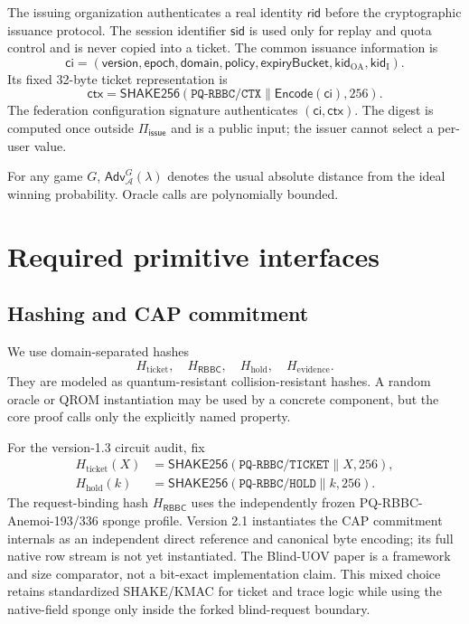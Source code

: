 \documentclass[11pt]{article}
\newcommand{\RBBC}{\mathsf{RBBC}}
\newcommand{\Piiss}{\Pi_{\mathsf{issue}}}
\newcommand{\Adv}{\mathsf{Adv}}
\newcommand{\rid}{\mathsf{rid}}
\newcommand{\ctx}{\mathsf{ctx}}
\begin{document}
The issuing organization authenticates a real identity $\rid$ before the
cryptographic issuance protocol.  The session identifier $\mathsf{sid}$ is used
only for replay and quota control and is never copied into a ticket.  The common
issuance information is
\[
  \mathsf{ci}=(\mathsf{version},\mathsf{epoch},\mathsf{domain},
  \mathsf{policy},\mathsf{expiryBucket},\mathsf{kid}_{\mathrm{OA}},
  \mathsf{kid}_{\mathrm{I}}).
\]
Its fixed 32-byte ticket representation is
\[
 \ctx=\mathsf{SHAKE256}(\mathtt{PQ\mbox{-}RBBC/CTX}\|
       \mathsf{Encode}(\mathsf{ci}),256).
\]
The federation configuration signature authenticates $(\mathsf{ci},\ctx)$.
The digest is computed once outside $\Piiss$ and is a public input; the issuer
cannot select a per-user value.

For any game $G$, $\Adv^G_{\mathcal A}(\lambda)$ denotes the usual absolute
distance from the ideal winning probability.  Oracle calls are polynomially
bounded.

\section{Required primitive interfaces}

\subsection{Hashing and CAP commitment}

We use domain-separated hashes
\[
  H_{\mathrm{ticket}},\quad H_{\RBBC},\quad H_{\mathrm{hold}},\quad
  H_{\mathrm{evidence}}.
\]
They are modeled as quantum-resistant collision-resistant hashes.  A random
oracle or QROM instantiation may be used by a concrete component, but the core
proof calls only the explicitly named property.

For the version-1.3 circuit audit, fix
\begin{align*}
 H_{\mathrm{ticket}}(X)&=\mathsf{SHAKE256}
   (\mathtt{PQ\mbox{-}RBBC/TICKET}\|X,256),\\
 H_{\mathrm{hold}}(k)&=\mathsf{SHAKE256}
   (\mathtt{PQ\mbox{-}RBBC/HOLD}\|k,256).
\end{align*}
The request-binding hash $H_{\RBBC}$ uses the independently frozen
PQ-RBBC-Anemoi-193/336 sponge profile.  Version 2.1 instantiates the CAP
commitment internals as an independent direct reference and canonical byte
encoding; its full native row stream is not yet instantiated.  The Blind-UOV
paper is a framework and size comparator, not a bit-exact implementation claim.
This mixed choice retains standardized
SHAKE/KMAC for ticket and trace logic while using the native-field sponge only
inside the forked blind-request boundary.
\end{document}
